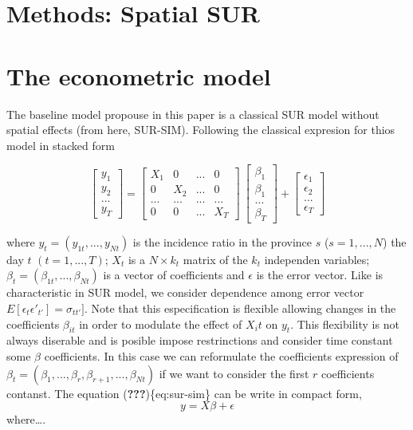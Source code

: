 \documentclass[]{elsarticle} %
\begin{document}
\hypertarget{methods-spatial-sur}{%
\section{Methods: Spatial SUR}\label{methods-spatial-sur}}

\hypertarget{the-econometric-model}{%
\section{The econometric model}\label{the-econometric-model}}

The baseline model propouse in this paper is a classical SUR model
without spatial effects (from here, SUR-SIM). Following the classical
expresion for thios model in stacked form

\begin{equation}
\begin{bmatrix}
y_1 \\ y_2 \\ ... \\ y_T
\end{bmatrix}
=
\begin{bmatrix}
X_1 & 0 & ... & 0 \\ 0 & X_2 & ... & 0 \\ ... & ... & ... & ... \\ 0 & 0 & ... & X_T
\end{bmatrix}
\
\begin{bmatrix}
\beta_1 \\ \beta_1 \\ ... \\ \beta_T
\end{bmatrix}
+
\begin{bmatrix}
\epsilon_1 \\ \epsilon_2 \\ ... \\ \epsilon_T
\end{bmatrix}
\label{eq:sur-sim}
\end{equation}

where \(y_{t}=(y_{1t},...,y_{Nt})\) is the incidence ratio in the
province \(s\) (\(s=1,...,N\)) the day \(t\) \((t=1,...,T)\); \(X_t\) is
a \(N \times k_t\) matrix of the \(k_t\) independen variables;
\(\beta_t=(\beta_{1t},...,\beta_{Nt})\) is a vector of coefficients and
\(\epsilon\) is the error vector. Like is characteristic in SUR model,
we consider dependence among error vector
\(E[\epsilon_t \epsilon'_{t'}]=\sigma_{tt'}]\). Note that this
especification is flexible allowing changes in the coefficients
\(\beta_{it}\) in order to modulate the effect of \(X_it\) on \(y_t\).
This flexibility is not always diserable and is posible impose
restrinctions and consider time constant some \(\beta\) coefficients. In
this case we can reformulate the coefficients expression of
\(\beta_t=(\beta_{1},...,\beta_{r},\beta_{r+1},...,\beta_{Nt})\) if we
want to consider the first \(r\) coefficients contanst. The equation
({\textbf{???}})\{eq:sur-sim\} can be write in compact form,
\begin{equation}
y = X \beta + \epsilon
\end{equation} where\ldots.
\end{document}
